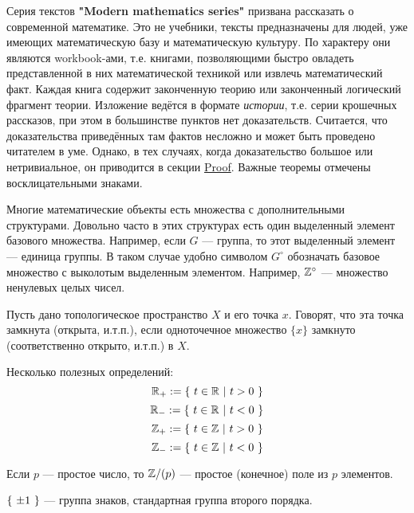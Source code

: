 




\SScover


\SSbullet
\vspace
Серия текстов \textbf{"Modern mathematics series"} призвана рассказать о современной математике. Это не учебники, тексты предназначены для людей, уже имеющих математическую базу и математическую культуру. По характеру они являются workbook-ами, т.е. книгами, позволяющими быстро овладеть представленной в них математической техникой или извлечь математический факт. Каждая книга содержит законченную теорию или законченный логический фрагмент теории. Изложение ведётся в формате \textit{истории}, т.е. серии крошечных рассказов, при этом в большинстве пунктов нет доказательств. Считается, что доказательства приведённых там фактов несложно и может быть проведено читателем в уме. Однако, в тех случаях, когда доказательство большое или нетривиальное, он приводится в секции \underline{Proof}. Важные теоремы отмечены восклицательными знаками.
\vspace

\SSbullet

\SSsect Многие математические объекты есть множества с дополнительными структурами.
Довольно часто в этих структурах есть один выделенный элемент базового множества. 
Например, если \( G \) --- группа, то этот выделенный элемент --- единица группы. 
В таком случае удобно символом \( G^\circ \) обозначать базовое множество с выколотым выделенным элементом.
Например, \( \mathbb{Z}^\circ \) --- множество ненулевых целых чисел.

\SSsect Пусть дано топологическое пространство \( X \) и его точка \( x \). Говорят, что эта точка замкнута (открыта, и.т.п.), если одноточечное множество \( \{ x \} \) замкнуто (соответственно открыто, и.т.п.) в \( X \).

\SSsect Несколько полезных определений:
\[ \mathbb{R}_+ := \left\lbrace~  t \in \mathbb{R}  ~|~  t>0  ~\right\rbrace \]
\[ \mathbb{R}_- := \left\lbrace~  t \in \mathbb{R}  ~|~  t<0  ~\right\rbrace \]
\[ \mathbb{Z}_+ := \left\lbrace~  t \in \mathbb{Z}  ~|~  t>0  ~\right\rbrace \]
\[ \mathbb{Z}_- := \left\lbrace~  t \in \mathbb{Z}  ~|~  t<0  ~\right\rbrace \]

\SSsect Если \( p \) --- простое число, то \( \mathbb{Z}/(p) \) --- простое (конечное) поле из \( p \) элементов.

\SSsect \( \left\lbrace~\pm1~\right\rbrace \) --- группа знаков, стандартная группа второго порядка.

